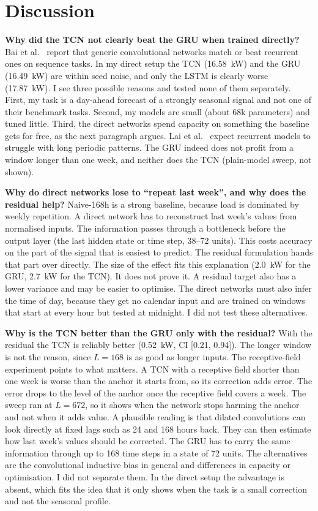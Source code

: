 \documentclass[10pt,a4paper]{article}
\begin{document}
\section{Discussion}
\textbf{Why did the TCN not clearly beat the GRU when trained directly?} Bai et al.\ \cite{bai} report that generic convolutional networks match or beat recurrent ones on sequence tasks. In my direct setup the TCN (16.58~kW) and the GRU (16.49~kW) are within seed noise, and only the LSTM is clearly worse (17.87~kW). I see three possible reasons and tested none of them separately. First, my task is a day-ahead forecast of a strongly seasonal signal and not one of their benchmark tasks. Second, my models are small (about 68k parameters) and tuned little. Third, the direct networks spend capacity on something the baseline gets for free, as the next paragraph argues. Lai et al.\ \cite{lai} expect recurrent models to struggle with long periodic patterns. The GRU indeed does not profit from a window longer than one week, and neither does the TCN (plain-model sweep, not shown).

\textbf{Why do direct networks lose to ``repeat last week'', and why does the residual help?} Naive-168h is a strong baseline, because load is dominated by weekly repetition. A direct network has to reconstruct last week's values from normalised inputs. The information passes through a bottleneck before the output layer (the last hidden state or time step, 38--72 units). This costs accuracy on the part of the signal that is easiest to predict. The residual formulation hands that part over directly. The size of the effect fits this explanation (2.0~kW for the GRU, 2.7~kW for the TCN). It does not prove it. A residual target also has a lower variance and may be easier to optimise. The direct networks must also infer the time of day, because they get no calendar input and are trained on windows that start at every hour but tested at midnight. I did not test these alternatives.

\textbf{Why is the TCN better than the GRU only with the residual?} With the residual the TCN is reliably better (0.52~kW, CI [0.21, 0.94]). The longer window is not the reason, since $L=168$ is as good as longer inputs. The receptive-field experiment points to what matters. A TCN with a receptive field shorter than one week is worse than the anchor it starts from, so its correction adds error. The error drops to the level of the anchor once the receptive field covers a week. The sweep ran at $L=672$, so it shows when the network stops harming the anchor and not when it adds value. A plausible reading is that dilated convolutions can look directly at fixed lags such as 24 and 168 hours back. They can then estimate how last week's values should be corrected. The GRU has to carry the same information through up to 168 time steps in a state of 72 units. The alternatives are the convolutional inductive bias in general and differences in capacity or optimisation. I did not separate them. In the direct setup the advantage is absent, which fits the idea that it only shows when the task is a small correction and not the seasonal profile.
\end{document}
